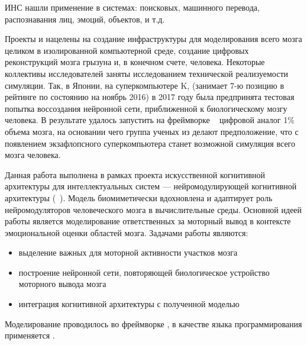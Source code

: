 ИНС нашли применение в системах: поисковых, 
машинного перевода, распознавания лиц, эмоций, объектов, и т.д.

Проекты  и  нацелены на создание инфраструктуры для моделирования всего мозга целиком в изолированной компьютерной среде, создание цифровых реконструкций мозга грызуна и, в конечном счете, человека. 
Некоторые коллективы исследователей заняты исследованием технической реализуемости симуляции. 
Так, в Японии, на суперкомпьютере K, (занимает 7-ю позицию в рейтинге  по состоянию на ноябрь 2016) в 2017 году была предпринята тестовая попытка воссоздания нейронной сети, приближенной к биологическому мозгу человека. 
В результате удалось запустить на фреймворке  ~\cite{nest} цифровой аналог 1\% объема мозга, на основании чего группа ученых из  делают предположение, что с появлением экзафлопсного суперкомпьютера станет возможной симуляция всего мозга человека.

Данная работа выполнена в рамках проекта искусственной когнитивной архитектуры для интеллектуальных систем --- нейромодулирующей когнитивной архитектуры (~\cite{neucogar}).
Модель биомиметически вдохновлена и адаптирует роль нейромодуляторов человеческого мозга в вычислительные среды.
Основной идеей работы является моделирование ответственных за моторный вывод в контексте эмоциональной оценки областей мозга.
Задачами работы являются:
\begin{itemize}
	\item выделение важных для моторной активности участков мозга
	\item построение нейронной сети, повторяющей биологическое устройство моторного вывода мозга
	\item интеграция когнитивной архитектуры  с полученной моделью
\end{itemize}

Моделирование проводилось во фреймворке , в качестве языка программирования применяется .





